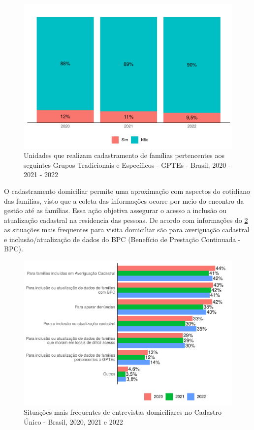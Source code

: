\documentclass[
  brazilian]{report}
\begin{document}
\begin{figure}
\includegraphics{Censo-SUAS-2022_files/figure-latex/gptes-cadunico-1} \caption[Unidades que realizam cadastramento de famílias pertencentes aos seguintes Grupos Tradicionais e Específicos - GPTEs - Brasil, 2020 - 2021 - 2022]{Unidades que realizam cadastramento de famílias pertencentes aos seguintes Grupos Tradicionais e Específicos - GPTEs - Brasil, 2020 - 2021 - 2022}\label{fig:gptes-cadunico}
\end{figure}

O cadastramento domiciliar permite uma aproximação com aspectos do
cotidiano das famílias, visto que a coleta das informações ocorre por
meio do encontro da gestão até as famílias. Essa ação objetiva assegurar
o acesso a inclusão ou atualização cadastral na residencia das pessoas.
De acordo com informações do \cref{fig:visit_dom} as situações mais
frequentes para visita domiciliar são para averiguação cadastral e
inclusão/atualização de dados do BPC (Benefício de Prestação Continuada
- BPC).

\begin{figure}
\includegraphics{Censo-SUAS-2022_files/figure-latex/visit_dom-1} \caption[Situações mais frequentes de entrevistas domiciliares no Cadastro Único - Brasil, 2020, 2021 e 2022]{Situações mais frequentes de entrevistas domiciliares no Cadastro Único - Brasil, 2020, 2021 e 2022}\label{fig:visit_dom}
\end{figure}
\end{document}
